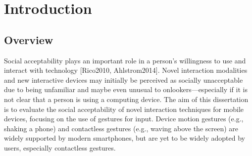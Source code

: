 \documentclass{l4proj}
\begin{document}
%
%
%
%
%
% 
%
%
\chapter{Introduction}



\section{Overview}
Social acceptability plays an important role in a person's willingness to use and interact with technology [Rico2010, Ahlstrom2014]. Novel interaction modalities and new interactive devices may initially be perceived as socially unacceptable due to being unfamiliar and maybe even unusual to onlookers---especially if it is not clear that a person is using a computing device. The aim of this dissertation is to evaluate the social acceptability of novel interaction techniques for mobile devices, focusing on the use of gestures for input. Device motion gestures (e.g., shaking a phone) and contactless gestures (e.g., waving above the screen) are widely supported by modern smartphones, but are yet to be widely adopted by users, especially contactless gestures.
\end{document}
